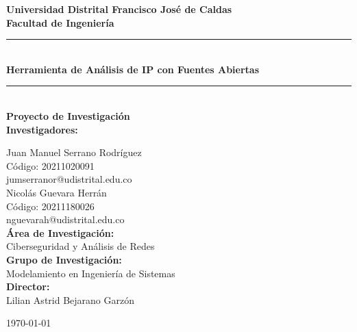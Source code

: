 \begin{titlepage}
\centering
\vspace*{1cm}

\textbf{\Large Universidad Distrital Francisco José de Caldas}\\
\textbf{\large Facultad de Ingeniería}\\
\vspace{1cm}

\rule{\linewidth}{0.2mm} \\[0.4cm]
{\huge \bfseries Herramienta de Análisis de IP con Fuentes Abiertas}\\
\rule{\linewidth}{0.2mm} \\[0.4cm]

{\large \textbf{Proyecto de Investigación}}\\[1cm]

{\large \textbf{Investigadores:}}\\
\vspace{0.5cm}

Juan Manuel Serrano Rodríguez\\
Código: 20211020091\\
jumserranor@udistrital.edu.co\\[1cm]
Nicolás Guevara Herrán\\
Código: 20211180026\\
nguevarah@udistrital.edu.co\\[0.5cm]

{\large \textbf{Área de Investigación:}}\\
Ciberseguridad y Análisis de Redes\\[0.5cm]

{\large \textbf{Grupo de Investigación:}}\\
Modelamiento en Ingeniería de Sistemas\\[0.5cm]

{\large \textbf{Director:}}\\
Lilian Astrid Bejarano Garzón\\[0.5cm]

\vfill

{\large \today}

\end{titlepage}
